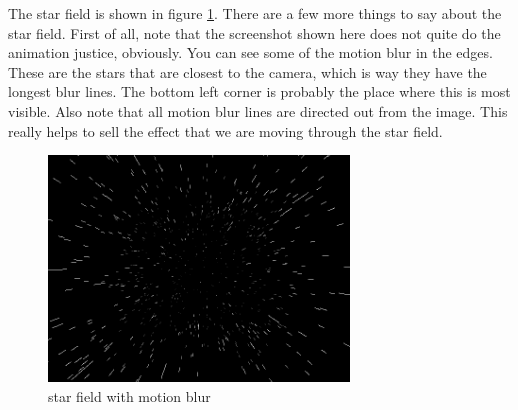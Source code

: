 \documentclass[a4paper]{article}
\begin{document}
The star field is shown in figure \ref{starfield_fig}.
There are a few more things to say about the star field.
First of all, note that the screenshot shown here does not quite do the animation justice, obviously.
You can see some of the motion blur in the edges.
These are the stars that are closest to the camera, which is way they have the longest blur lines.
The bottom left corner is probably the place where this is most visible.
Also note that all motion blur lines are directed out from the image.
This really helps to sell the effect that we are moving through the star field.

\begin{figure}[H]
\begin{center}
\includegraphics[width=8cm]{starfield.png}
\caption{star field with motion blur}
\label{starfield_fig}
\end{center}
\end{figure}
\end{document}
